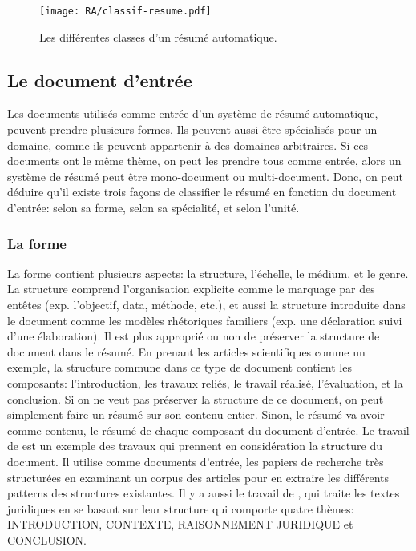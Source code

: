 \documentclass[a4paper,12pt,oneside]{../use/ESIthesis}
\begin{document}
\begin{figure}[ht]
\begin{center}
\texttt{[image: RA/classif-resume.pdf]} %
 \caption{Les différentes classes d'un résumé automatique.}
 \label{fig:classif-resume}
\end{center}
\end{figure}

\subsection{Le document d'entrée}

Les documents utilisés comme entrée d'un système de résumé automatique, peuvent prendre plusieurs formes. 
Ils peuvent aussi être spécialisés pour un domaine, comme ils peuvent appartenir à des domaines arbitraires. 
Si ces documents ont le même thème, on peut les prendre tous comme entrée, alors un système de résumé peut être mono-document ou multi-document. 
Donc, on peut déduire qu'il existe trois façons de classifier le résumé en fonction du document d'entrée: selon sa forme, selon sa spécialité, et selon l'unité.

\subsubsection{La forme}

La forme contient plusieurs aspects: la structure, l'échelle, le médium, et le genre. 
La structure comprend l'organisation explicite comme le marquage par des entêtes (exp. l'objectif, data, méthode, etc.), 
et aussi la structure introduite dans le document comme les modèles rhétoriques familiers (exp. une déclaration suivi d'une élaboration). 
Il est plus approprié ou non de préserver la structure de document dans le résumé. 
En prenant les articles scientifiques comme un exemple, la structure commune dans ce type de document contient les composants: l'introduction, les travaux reliés, le travail réalisé, l'évaluation, et la conclusion. 
Si on ne veut pas préserver la structure de ce document, on peut simplement faire un résumé sur son contenu entier. 
Sinon, le résumé va avoir comme contenu, le résumé de chaque composant du document d'entrée. 
Le travail de \cite{93-paice-jones} est un exemple des travaux qui prennent en considération la structure du document. 
Il utilise comme documents d'entrée, les papiers de recherche très structurées en examinant un corpus des articles pour en extraire les différents patterns des structures existantes. 
Il y a aussi le travail de \cite{04-farzindar-al}, qui traite les textes juridiques en se basant sur leur structure qui comporte quatre thèmes: INTRODUCTION, CONTEXTE, RAISONNEMENT JURIDIQUE et CONCLUSION. 
\end{document}
